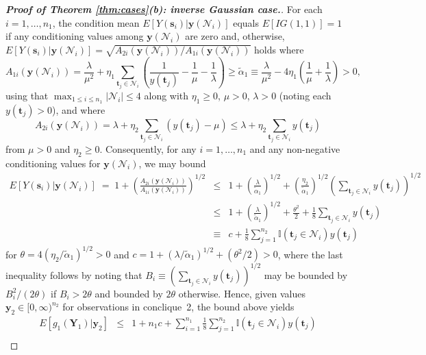 \documentclass[12pt]{article}
\theoremstyle{definition}
\begin{document}
\begin{proof}[\bf Proof of Theorem \ref{thm:cases}(b): inverse Gaussian case.]
   For each $i=1,\ldots,n_1$, the condition mean 
  $E[ Y(\boldsymbol s_i) | \boldsymbol y(\mathcal{N}_i)] $ equals $E [IG(1,1)]=1 $ if any conditioning values among   $\boldsymbol y(\mathcal{N}_i)$
  are zero and, otherwise,  $E[ Y(\boldsymbol s_i) | \boldsymbol y(\mathcal{N}_i)] = \sqrt{A_{2i}(\boldsymbol y(\mathcal{N}_i)) /A_{1i}(\boldsymbol y(\mathcal{N}_i)) }$ holds where
  \[
A_{1i}(\boldsymbol y(\mathcal{N}_i))  = \frac{\lambda}{\mu^2} + \eta_1 \sum\limits_{\boldsymbol t_j \in \mathcal{N}_i}\left(\frac{1}{y(\boldsymbol t_j)} - \frac{1}{\mu} - \frac{1}{\lambda}\right)  \geq  \tilde{\alpha}_1\equiv \frac{\lambda}{\mu^2} -4 \eta_1\left(\frac{1}{\mu} + \frac{1}{\lambda}\right)>0,
  \]
  using that $ \max_{1 \leq i \leq n_1}| \mathcal{N}_i| \leq 4 $  along with $\eta_1 \geq 0$, $\mu>0$, $\lambda>0$ (noting each $y(\boldsymbol t_j)>0$), and where
\[
A_{2i}(\boldsymbol y(\mathcal{N}_i)) = \lambda + \eta_2 \sum\limits_{\boldsymbol t_j \in \mathcal{N}_i}\left(y(\boldsymbol t_j) - \mu \right)
  \leq  \lambda + \eta_2 \sum\limits_{\boldsymbol t_j \in \mathcal{N}_i} y(\boldsymbol t_j)
  \]
  from $\mu>0$ and $\eta_2 \geq0$.  Consequently, for any $i=1,\ldots, n_1$ and any non-negative conditioning values for $\boldsymbol y(\mathcal{N}_i)$, we may bound
  \begin{eqnarray*}
  E[ Y(\boldsymbol s_i) | \boldsymbol y(\mathcal{N}_i)]  \;=\; 1+ \left(\frac{A_{2i}(\boldsymbol y(\mathcal{N}_i)) }{A_{1i}(\boldsymbol y(\mathcal{N}_i))}\right)^{1/2}  &\leq& 1+ \left(\frac{\lambda}{\tilde{\alpha}_1}\right)^{1/2} + \left(\frac{\eta_2}{\tilde{\alpha}_1}\right)^{1/2}
     \left( \sum\limits_{\boldsymbol t_j \in \mathcal{N}_i} y(\boldsymbol t_j) \right)^{1/2}\\
     &\leq&  1+\left(\frac{\lambda}{\tilde{\alpha}_1}\right)^{1/2} + \frac{\theta^2}{2} + \frac{1}{8}\sum\limits_{\boldsymbol t_j \in \mathcal{N}_i} y(\boldsymbol t_j)\\
     & \equiv & c  + \frac{1}{8}\sum_{j=1}^{n_2} \mathbb{I}(\boldsymbol t_j \in\mathcal{N}_i) y(\boldsymbol t_j)
  \end{eqnarray*}
for $\theta = 4(\eta_2/\tilde{\alpha}_1)^{1/2}>0$ and $c  = 1+(\lambda/\tilde{\alpha}_1)^{1/2} + (\theta^2/2)>0$, where the last inequality follows by  noting that
 $B_i \equiv  ( \sum_{\boldsymbol t_j \in \mathcal{N}_i} y(\boldsymbol t_j) )^{1/2}$ may be bounded by $B_i^2/(2 \theta)$
 if $B_i >2 \theta$ and bounded by  $2 \theta$ otherwise. Hence,
 given values    $\boldsymbol y_2 \in [0,\infty)^{n_2}$ for observations in conclique~2,  the bound above yields
  \begin{eqnarray*}E  [g_1(\boldsymbol Y_1) \big| \boldsymbol y_2 ] &\leq& 1 + n_1c   + \sum_{i=1}^{n_1}\frac{1}{8}\sum_{j=1}^{n_2} \mathbb{I}(\boldsymbol t_j \in\mathcal{N}_i) y(\boldsymbol t_j)\\

\end{eqnarray*}
\end{proof}
\end{document}
